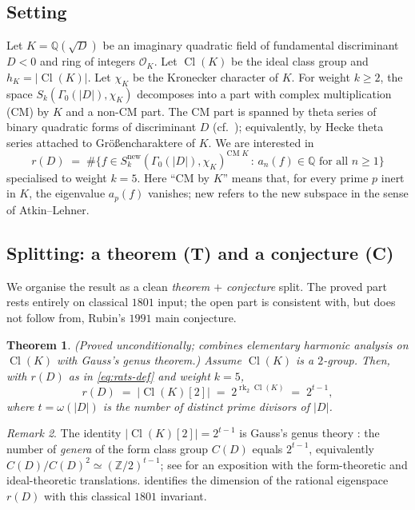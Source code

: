 \documentclass[11pt]{amsart}
\newtheorem{theorem}{Theorem}
\theoremstyle{definition}
\theoremstyle{remark}
\newtheorem{remark}[theorem]{Remark}
\DeclareMathOperator{\Cl}{Cl}
\DeclareMathOperator{\rk}{rk}
\newcommand{\Q}{\mathbb{Q}}
\newcommand{\Z}{\mathbb{Z}}
\newcommand{\OK}{\mathcal{O}_K}
\newcommand{\chiK}{\chi_K}
\begin{document}
\subsection{Setting}
Let \(K = \Q(\sqrt{D})\) be an imaginary quadratic field of fundamental
discriminant \(D < 0\) and ring of integers \(\OK\). Let \(\Cl(K)\) be
the ideal class group and \(h_K = |\Cl(K)|\). Let \(\chiK\) be the
Kronecker character of \(K\). For weight \(k \ge 2\), the space
\(S_k(\Gamma_0(|D|), \chiK)\) decomposes into a part with complex
multiplication (CM) by \(K\) and a non-CM part. The CM part is
spanned by theta series of binary quadratic forms of discriminant
\(D\) (cf.\ \cite{Shimura1971}); equivalently, by Hecke theta series
attached to Gr\"o\ss encharaktere of \(K\). We are interested in
\begin{equation}\label{eq:rats-def}
  r(D) \;=\; \#\bigl\{
     f \in S_k^{\mathrm{new}}(\Gamma_0(|D|), \chiK)^{\mathrm{CM}\;K}
   \,:\, a_n(f) \in \Q \text{ for all } n \ge 1
   \bigr\}
\end{equation}
specialised to weight \(k = 5\). Here ``CM by \(K\)'' means that, for
every prime \(p\) inert in \(K\), the eigenvalue \(a_p(f)\) vanishes;
\(\mathrm{new}\) refers to the new subspace in the sense of
Atkin--Lehner.

\subsection{Splitting: a theorem (T) and a conjecture (C)}
We organise the result as a clean
\emph{theorem \(+\) conjecture} split. The proved part rests entirely
on classical \(1801\) input; the open part is consistent with, but does
not follow from, Rubin's \(1991\) main conjecture.

\begin{theorem}\label{thm:main}
\emph{(Proved unconditionally; combines elementary harmonic analysis
on \(\Cl(K)\) with Gauss's genus theorem.)}
Assume \(\Cl(K)\) is a \(2\)-group. Then, with \(r(D)\) as in
\eqref{eq:rats-def} and weight \(k=5\),
\[
  r(D) \;=\; |\Cl(K)[2]| \;=\; 2^{\rk_2 \Cl(K)} \;=\; 2^{t-1},
\]
where \(t = \omega(|D|)\) is the number of distinct prime divisors of
\(|D|\).
\end{theorem}

\begin{remark}\label{rem:gauss-bridge}
The identity \(|\Cl(K)[2]| = 2^{t-1}\) is Gauss's genus theory
\cite[\S\S 225--237]{Gauss1801}: the number of \emph{genera} of the
form class group \(C(D)\) equals \(2^{t-1}\), equivalently
\(C(D)/C(D)^2 \simeq (\Z/2)^{t-1}\); see
\cite[Thm.~3.15]{Cox1989} for an exposition with the form-theoretic and
ideal-theoretic translations.  identifies the dimension
of the rational eigenspace \(r(D)\) with this classical \(1801\)
invariant.
\end{remark}
\end{document}
